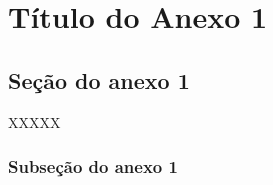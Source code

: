 \chapter{Título do Anexo 1}\label{chp:anexo}

\section{Seção do anexo 1}

XXXXX

\subsection{Subseção do anexo 1}